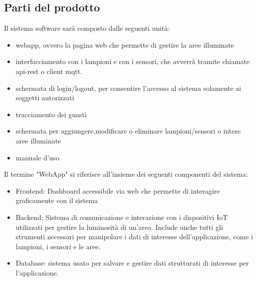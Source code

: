 \documentclass[12pt]{article}
\begin{document}
\subsection{Parti del prodotto}
Il sistema software sarà composto dalle seguenti unità:
\begin{itemize}
	\item webapp, ovvero la pagina web che permette di gestire la aree illuminate
	\item interfacciamento con i lampioni e con i sensori, che avverrà tramite chiamate api-rest o client mqtt.
	\item schermata di login/logout, per consentire l'accesso al sistema solamente ai soggetti autorizzati
	\item tracciamento dei guasti
	\item schermata per aggiungere,modificare o eliminare lampioni/sensori o intere aree illuminate
	\item manuale d'uso
\end{itemize}
Il termine "WebApp" si riferisce all'insieme dei seguenti componenti del sistema:
\begin{itemize}
	\item Frontend: Dashboard accessibile via web che permette di interagire graficamente con il sistema
	\item Backend: Sistema di comunicazione e interazione con i dispositivi IoT utilizzati per gestire la luminosità di un'area. Include anche tutti gli strumenti necessari per manipolare i dati di interesse dell'applicazione, come i lampioni, i sensori e le aree.
	\item Database: sistema usato per salvare e gestire dati strutturati di interesse per l'applicazione.
\end{itemize}
\end{document}
